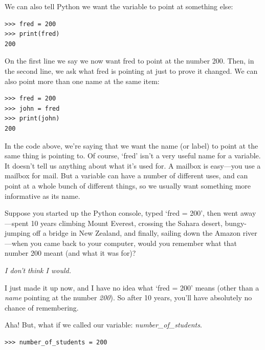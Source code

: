 We can also tell Python we want the variable  to point at something else:

\begin{listing}
\begin{verbatim}
>>> fred = 200
>>> print(fred)
200
\end{verbatim}
\end{listing}

\noindent
On the first line we say we now want fred to point at the number 200.  Then, in the second line, we ask what fred is pointing at just to prove it changed. We can also point more than one name at the same item:

\begin{listing}
\begin{verbatim}
>>> fred = 200
>>> john = fred
>>> print(john)
200
\end{verbatim}
\end{listing}

In the code above, we're saying that we want the name (or label)  to point at the same thing  is pointing to.
Of course, `fred' isn't a very useful name for a variable.  It doesn't tell us anything about what it's used for.  A mailbox is easy---you use a mailbox for mail.  But a variable can have a number of different uses, and can point at a whole bunch of different things, so we usually want something more informative as its name.
\par
Suppose you started up the Python console, typed `fred = 200', then went away---spent 10 years climbing Mount Everest, crossing the Sahara desert, bungy-jumping off a bridge in New Zealand, and finally, sailing down the Amazon river---when you came back to your computer, would you remember what that number 200 meant (and what it was for)?

\noindent
\emph{I don't think I would.}

\noindent
I just made it up now, and I have no idea what `fred = 200' means (other than a \emph{name} pointing at the number \emph{200}).  So after 10 years, you'll have absolutely no chance of remembering.
\par
Aha!  But, what if we called our variable: \emph{number\_of\_students}.

\begin{listing}
\begin{verbatim}
>>> number_of_students = 200
\end{verbatim}
\end{listing}

